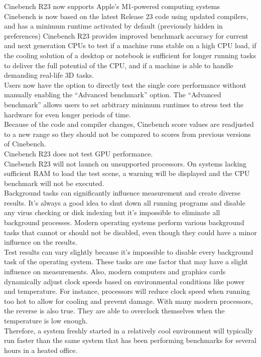 \documentclass[11pt, a4paper, oneside]{article}
\theoremstyle{definition}
\begin{document}
     Cinebench R23 now supports Apple’s M1-powered computing systems\\
     Cinebench is now based on the latest Release 23 code using updated compilers, and has a minimum runtime activated by default (previously hidden in preferences)
     Cinebench R23 provides improved benchmark accuracy for current and next generation CPUs to test if a machine runs stable on a high CPU load, if the cooling solution of a desktop or notebook is sufficient for longer running tasks to deliver the full potential of the CPU, and if a machine is able to handle demanding real-life 3D tasks.\\
     Users now have the option to directly test the single core performance without manually enabling the “Advanced benchmark” option. The “Advanced benchmark” allows users to set arbitrary minimum runtimes to stress test the hardware for even longer periods of time.\\
     Because of the code and compiler changes, Cinebench score values are readjusted to a new range so they should not be compared to scores from previous versions of Cinebench.\\
     Cinebench R23 does not test GPU performance.\\
     Cinebench R23 will not launch on unsupported processors. On systems lacking sufficient RAM to load the test scene, a warning will be displayed and the CPU benchmark will not be executed.\\
     Background tasks can significantly influence measurement and create diverse results. It's always a good idea to shut down all running programs and disable any virus checking or disk indexing but it's impossible to eliminate all background processes. Modern operating systems perform various background tasks that cannot or should not be disabled, even though they could have a minor influence on the results.\\
     Test results can vary slightly because it's impossible to disable every background task of the operating system. These tasks are one factor that may have a slight influence on measurements. Also, modern computers and graphics cards dynamically adjust clock speeds based on environmental conditions like power and temperature. For instance, processors will reduce clock speed when running too hot to allow for cooling and prevent damage. With many modern processors, the reverse is also true. They are able to overclock themselves when the temperature is low enough.\\ Therefore, a system freshly started in a relatively cool environment will typically run faster than the same system that has been performing benchmarks for several hours in a heated office.\\
     
\end{document}
